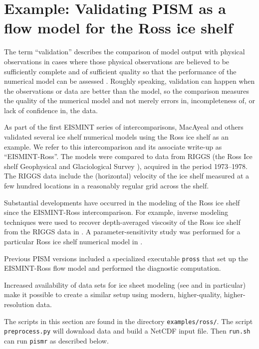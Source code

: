 
\section{Example: Validating PISM as a flow model for the Ross ice shelf}\label{sec:ross}   

The term ``validation'' describes the comparison of model output with physical observations in cases where those physical observations are believed to be sufficiently complete and of sufficient quality so that the performance of the numerical model can be assessed \cite{Roache,Wesseling}.  Roughly speaking, validation can happen when the observations or data are better than the model, so the comparison measures the quality of the numerical model and not merely errors in, incompleteness of, or lack of confidence in, the data.

As part of the first EISMINT series of intercomparisons, MacAyeal and others \cite{MacAyealetal} validated several ice shelf numerical models using the Ross ice shelf as an example.  We refer to this intercomparison and its associate write-up \cite{MacAyealetal} as ``EISMINT-Ross''.  The models were compared to data from RIGGS (the Ross Ice shelf Geophysical and Glaciological Survey \cite{RIGGS2,RIGGS1}), acquired in the period 1973--1978.   The RIGGS data include the (horizontal) velocity of the ice shelf measured at a few hundred locations in a reasonably regular grid across the shelf.

Substantial developments have occurred in the modeling of the Ross ice shelf since the EISMINT-Ross intercomparison.  For example, inverse modeling techniques were used to recover depth-averaged viscosity of the Ross ice shelf from the RIGGS data in \cite{RommelaereMacAyeal}. A parameter-sensitivity study was performed for a particular Ross ice shelf numerical model in \cite{HumbertGreveHutter}.

Previous PISM versions included a specialized executable \texttt{pross} that set up the EISMINT-Ross flow model and performed the diagnostic computation.

Increased availability of data sets for ice sheet modeling (see \cite{LeBrocqetal2010} and \cite{Rignot09092011} in particular) make it possible to create a similar setup using modern, higher-quality, higher-resolution data.

The scripts in this section are found in the directory \texttt{examples/ross/}.  The script \texttt{preprocess.py} will download data and build a NetCDF input file. Then \texttt{run.sh} can run \texttt{pismr} as described below.

